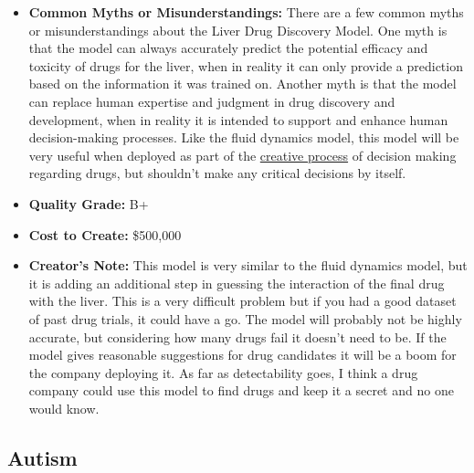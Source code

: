 \begin{itemize}
    \item \textbf{Common Myths or Misunderstandings:} There are a few common myths or misunderstandings about the Liver Drug Discovery Model. One myth is that the model can always accurately predict the potential efficacy and toxicity of drugs for the liver, when in reality it can only provide a prediction based on the information it was trained on.  Another myth is that the model can replace human expertise and judgment in drug discovery and development, when in reality it is intended to support and enhance human decision-making processes. Like the fluid dynamics model, this model will be very useful when deployed as part of the \hyperref[sec:creative]{creative process} of decision making regarding drugs, but shouldn't make any critical decisions by itself. 
    \item \textbf{Quality Grade:} B+
    \item \textbf{Cost to Create:} \$500,000
    \item \textbf{Creator's Note:} This model is very similar to the fluid dynamics model, but it is adding an additional step in guessing the interaction of the final drug with the liver. This is a very difficult problem but if you had a good dataset of past drug trials, it could have a go. The model will probably not be highly accurate, but considering how many drugs fail it doesn't need to be. If the model gives reasonable suggestions for drug candidates it will be a boom for the company deploying it. As far as detectability goes, I think a drug company could use this model to find drugs and keep it a secret and no one would know.
\end{itemize}

\subsection{Autism}

